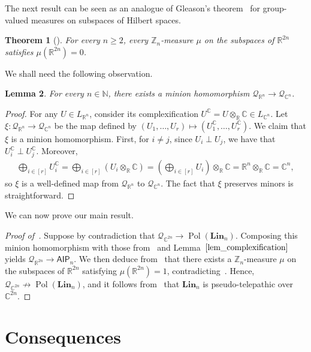 \documentclass[11pt]{article}
\newcommand{\C}{\mathbb C}
\newcommand{\R}{\mathbb R}
\newcommand{\N}{\mathbb N}
\newcommand{\Z}{\mathbb Z}
\newcommand{\Lin}{\mathbf{Lin}}
\newcommand{\AIP}{\mathsf{AIP}}
\DeclareMathOperator{\Pol}{Pol}
\newcommand{\minion}[1]{{\mathcal #1}}
\theoremstyle{plain}
\newtheorem{theorem}{Theorem}
\newtheorem{lemma}[theorem]{Lemma}
\theoremstyle{definition}
\theoremstyle{remark}
\begin{document}
The next result can be seen as an analogue of Gleason's theorem~\cite{gleason1975measures} for group-valued measures on subspaces of Hilbert spaces.

\begin{theorem}[{\cite[Lemma~2]{harding2005group}}]
\label{lem_hjs}
For every $n\geq2$, every $\Z_n$-measure $\mu$ on the subspaces of $\R^{2n}$ satisfies $\mu(\R^{2n})=0$.
\end{theorem}

We shall need the following observation.
\begin{lemma}
\label{lem_complexification}
For every $n\in\N$, there exists a minion homomorphism $\minion Q_{\R^n}\to\minion Q_{\C^n}$.    
\end{lemma}
\begin{proof}
    For any $U\in L_{\R^n}$, consider its complexification $U^{\C}=U\otimes_{\R}\C\in L_{\C^n}$. Let $\xi:\minion Q_{\R^n}\to\minion Q_{\C^n}$ be the map defined by $(U_1,\dots,U_r)\mapsto (U_1^\C,\dots,U_r^\C)$. We claim that $\xi$ is a minion homomorphism. First, for $i\neq j$, since $U_i\perp U_j$, we have that $U_i^\C\perp U_j^\C$. Moreover,
    \begin{align*}
        \bigoplus_{i\in[r]}U_i^\C=\bigoplus_{i\in[r]}(U_i\otimes_{\R}\C)=(\bigoplus_{i\in[r]}U_i)\otimes_{\R}\C=\R^n\otimes_\R\C=\C^n,
        \end{align*}
        so $\xi$ is a well-defined map from $\minion Q_{\R^n}$ to $\minion Q_{\C^n}$. The fact that $\xi$ preserves minors is straightforward.
\end{proof}


We can now prove our main result.

\begin{proof}[Proof of~]
%
%
Suppose by contradiction that $\minion Q_{\C^{2n}}\to\Pol(\Lin_n)$. Composing this minion homomorphism with  those from~ and Lemma~$\ref{lem_complexification}$ yields $\minion Q_{\R^{2n}}\to\AIP_n$. We then deduce from~ that there exists a $\Z_n$-measure $\mu$ on the subspaces of $\R^{2n}$ satisfying $\mu(\R^{2n})=1$, contradicting~.
%
    Hence, $\minion Q_{\C^{2n}}\not\to\Pol(\Lin_n)$, and it follows from~ that $\Lin_n$ is pseudo-telepathic over $\C^{2n}$.
\end{proof}

\section{Consequences}
\end{document}
